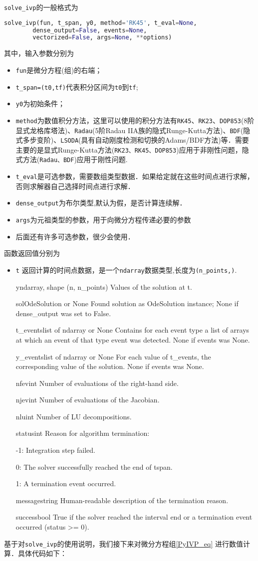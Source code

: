  \verb|solve_ivp|的一般格式为
 \begin{lstlisting}[language=python]
 solve_ivp(fun, t_span, y0, method='RK45', t_eval=None,
        dense_output=False, events=None, 
        vectorized=False, args=None, **options)
 \end{lstlisting}
 其中，输入参数分别为
\begin{itemize}
\item \verb|fun|是微分方程(组)的右端；
\item  \verb|t_span=(t0,tf)|代表积分区间为\verb|t0|到\verb|tf|;
\item  \verb|y0|为初始条件；
\item \verb|method|为数值积分方法，这里可以使用的积分方法有\verb|RK45|、\verb|RK23|、\verb|DOP853|(8阶显式龙格库塔法)、\verb|Radau|(5阶Radau IIA族的隐式Runge-Kutta方法)、\verb|BDF|(隐式多步变阶)、\verb|LSODA|(具有自动刚度检测和切换的Adams/BDF方法)等．需要主要的是显式Runge-Kutta方法(\verb|RK23、RK45、DOP853|)应用于非刚性问题，隐式方法(\verb|Radau、BDF|)应用于刚性问题.
\item \verb|t_eval|是可选参数，需要数组类型数据．如果给定就在这些时间点进行求解，否则求解器自己选择时间点进行求解．
\item \verb|dense_output|为布尔类型,默认为假，是否计算连续解．
\item \verb|args|为元祖类型的参数，用于向微分方程传递必要的参数
\item 后面还有许多可选参数，很少会使用．
\end{itemize}
函数返回值分别为
\begin{itemize}
\item  \verb|t| 返回计算的时间点数据，是一个\verb|ndarray|数据类型,长度为\verb|(n_points,)|.

yndarray, shape (n, n_points)
Values of the solution at t.

solOdeSolution or None
Found solution as OdeSolution instance; None if dense_output was set to False.

t_eventslist of ndarray or None
Contains for each event type a list of arrays at which an event of that type event was detected. None if events was None.

y_eventslist of ndarray or None
For each value of t_events, the corresponding value of the solution. None if events was None.

nfevint
Number of evaluations of the right-hand side.

njevint
Number of evaluations of the Jacobian.

nluint
Number of LU decompositions.

statusint
Reason for algorithm termination:

-1: Integration step failed.

0: The solver successfully reached the end of tspan.

1: A termination event occurred.

messagestring
Human-readable description of the termination reason.

successbool
True if the solver reached the interval end or a termination event occurred (status >= 0).
\end{itemize}


基于对\verb|solve_ivp|的使用说明，我们接下来对微分方程组\ref{PyIVP_eq} 进行数值计算．具体代码如下：
\begin{lstlisting}[language=python]

\end{lstlisting}